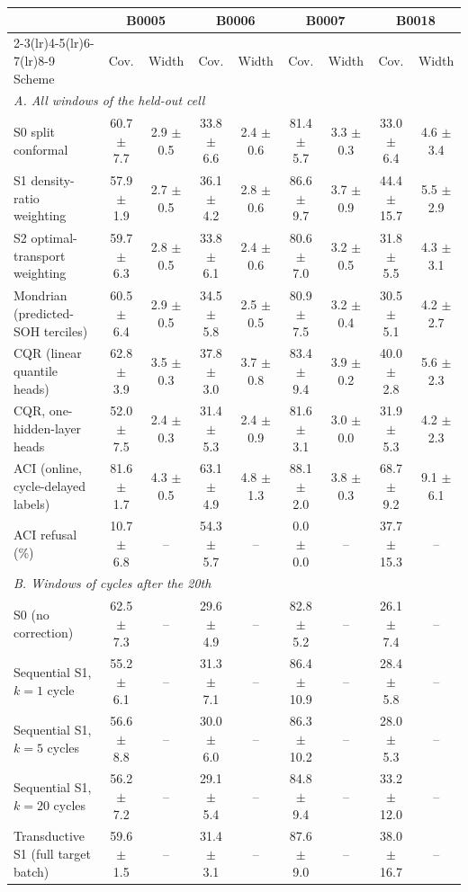 \begin{tabular}{lcccccccc}
\toprule
& \multicolumn{2}{c}{B0005} & \multicolumn{2}{c}{B0006} & \multicolumn{2}{c}{B0007} & \multicolumn{2}{c}{B0018} \\
\cmidrule(lr){2-3}\cmidrule(lr){4-5}\cmidrule(lr){6-7}\cmidrule(lr){8-9}
Scheme & Cov. & Width & Cov. & Width & Cov. & Width & Cov. & Width \\
\midrule
\multicolumn{9}{l}{\textit{A. All windows of the held-out cell}} \\
S0 split conformal & 60.7 $\pm$ 7.7 & 2.9 $\pm$ 0.5 & 33.8 $\pm$ 6.6 & 2.4 $\pm$ 0.6 & 81.4 $\pm$ 5.7 & 3.3 $\pm$ 0.3 & 33.0 $\pm$ 6.4 & 4.6 $\pm$ 3.4 \\
S1 density-ratio weighting & 57.9 $\pm$ 1.9 & 2.7 $\pm$ 0.5 & 36.1 $\pm$ 4.2 & 2.8 $\pm$ 0.6 & 86.6 $\pm$ 9.7 & 3.7 $\pm$ 0.9 & 44.4 $\pm$ 15.7 & 5.5 $\pm$ 2.9 \\
S2 optimal-transport weighting & 59.7 $\pm$ 6.3 & 2.8 $\pm$ 0.5 & 33.8 $\pm$ 6.1 & 2.4 $\pm$ 0.6 & 80.6 $\pm$ 7.0 & 3.2 $\pm$ 0.5 & 31.8 $\pm$ 5.5 & 4.3 $\pm$ 3.1 \\
Mondrian (predicted-SOH terciles) & 60.5 $\pm$ 6.4 & 2.9 $\pm$ 0.5 & 34.5 $\pm$ 5.8 & 2.5 $\pm$ 0.5 & 80.9 $\pm$ 7.5 & 3.2 $\pm$ 0.4 & 30.5 $\pm$ 5.1 & 4.2 $\pm$ 2.7 \\
CQR (linear quantile heads) & 62.8 $\pm$ 3.9 & 3.5 $\pm$ 0.3 & 37.8 $\pm$ 3.0 & 3.7 $\pm$ 0.8 & 83.4 $\pm$ 9.4 & 3.9 $\pm$ 0.2 & 40.0 $\pm$ 2.8 & 5.6 $\pm$ 2.3 \\
\quad CQR, one-hidden-layer heads & 52.0 $\pm$ 7.5 & 2.4 $\pm$ 0.3 & 31.4 $\pm$ 5.3 & 2.4 $\pm$ 0.9 & 81.6 $\pm$ 3.1 & 3.0 $\pm$ 0.0 & 31.9 $\pm$ 5.3 & 4.2 $\pm$ 2.3 \\
ACI (online, cycle-delayed labels) & 81.6 $\pm$ 1.7 & 4.3 $\pm$ 0.5 & 63.1 $\pm$ 4.9 & 4.8 $\pm$ 1.3 & 88.1 $\pm$ 2.0 & 3.8 $\pm$ 0.3 & 68.7 $\pm$ 9.2 & 9.1 $\pm$ 6.1 \\
\quad ACI refusal (\%) & 10.7 $\pm$ 6.8 & -- & 54.3 $\pm$ 5.7 & -- & 0.0 $\pm$ 0.0 & -- & 37.7 $\pm$ 15.3 & -- \\
\midrule
\multicolumn{9}{l}{\textit{B. Windows of cycles after the 20th}} \\
S0 (no correction) & 62.5 $\pm$ 7.3 & -- & 29.6 $\pm$ 4.9 & -- & 82.8 $\pm$ 5.2 & -- & 26.1 $\pm$ 7.4 & -- \\
Sequential S1, $k=1$ cycle & 55.2 $\pm$ 6.1 & -- & 31.3 $\pm$ 7.1 & -- & 86.4 $\pm$ 10.9 & -- & 28.4 $\pm$ 5.8 & -- \\
Sequential S1, $k=5$ cycles & 56.6 $\pm$ 8.8 & -- & 30.0 $\pm$ 6.0 & -- & 86.3 $\pm$ 10.2 & -- & 28.0 $\pm$ 5.3 & -- \\
Sequential S1, $k=20$ cycles & 56.2 $\pm$ 7.2 & -- & 29.1 $\pm$ 5.4 & -- & 84.8 $\pm$ 9.4 & -- & 33.2 $\pm$ 12.0 & -- \\
Transductive S1 (full target batch) & 59.6 $\pm$ 1.5 & -- & 31.4 $\pm$ 3.1 & -- & 87.6 $\pm$ 9.0 & -- & 38.0 $\pm$ 16.7 & -- \\
\bottomrule
\end{tabular}
